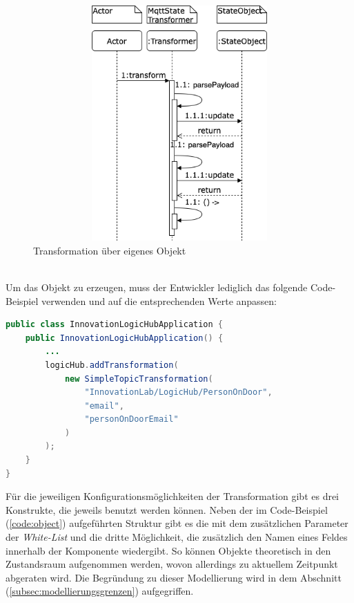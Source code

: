     \begin{figure}[hbt!]
        \centering
        \includegraphics[width=14cm,height=9cm,keepaspectratio]{images/Transformation_new.drawio.png}
        \caption{Transformation über eigenes Objekt}
        \label{fig:sequenceTransformationNew}
    \end{figure}
    \\
    Um das Objekt zu erzeugen, muss der Entwickler lediglich das folgende Code-Beispiel verwenden und auf die entsprechenden Werte anpassen:
\begin{lstlisting}[language=Java, frame=lines, xleftmargin=\parindent, style=algoBericht, label={code:object}, captionpos=b, caption={Transformation über ein eigenes Objekt}]
public class InnovationLogicHubApplication {
    public InnovationLogicHubApplication() {
        ... 
        logicHub.addTransformation(
            new SimpleTopicTransformation(
                "InnovationLab/LogicHub/PersonOnDoor",
                "email",
                "personOnDoorEmail"
            )
        );
    }
}
\end{lstlisting}
    Für die jeweiligen Konfigurationsmöglichkeiten der Transformation gibt es drei Konstrukte, die jeweils benutzt werden können. 
    Neben der im Code-Beispiel (\ref{code:object}) aufgeführten Struktur gibt es die mit dem zusätzlichen Parameter der \textit{White-List} und 
    die dritte Möglichkeit, die zusätzlich den Namen eines Feldes innerhalb der Komponente wiedergibt. So können Objekte theoretisch in den Zustandsraum 
    aufgenommen werden, wovon allerdings zu aktuellem Zeitpunkt abgeraten wird. Die Begründung zu dieser Modellierung wird in dem Abschnitt 
    (\ref{subsec:modellierungsgrenzen}) aufgegriffen. 
